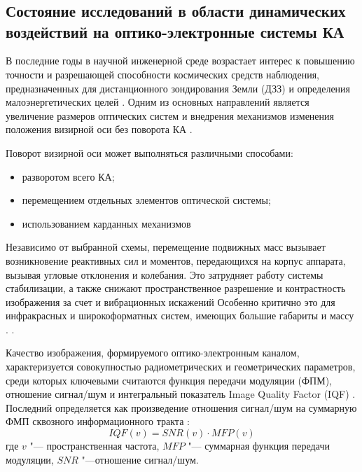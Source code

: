 \chapter{}\label{ch:ch1}
\section{Состояние исследований в области динамических воздействий на оптико-электронные системы КА}

В последние годы в научной инженерной среде возрастает интерес к повышению точности и разрешающей способности космических средств наблюдения, предназначенных для дистанционного зондирования Земли (ДЗЗ) и определения малоэнергетических целей \cite{haroon2020multisized, bouwmeester2023enabling, saunders2017building, cheng2024geometric, hamm2015earth}. Одним из основных направлений является увеличение размеров оптических систем и внедрения механизмов изменения положения визирной оси без поворота КА \cite{kandepi2024agile, franze2023attitude}.

Поворот визирной оси может выполняться различными способами:
\begin{itemize}
	\item разворотом всего КА;
	\item перемещением отдельных элементов оптической системы;
	\item использованием карданных механизмов \cite{leskov2010kardan,negro2023inertial}
\end{itemize}

Независимо от выбранной схемы, перемещение подвижных масс вызывает возникновение реактивных сил и моментов, передающихся на корпус аппарата, вызывая угловые отклонения и колебания. Это затрудняет работу системы стабилизации, а также снижают пространственное разрешение и контрастность изображения за счет \blur{} и вибрационных искажений  \cite{lappas2002attitude, углова2019оценка, zhao2023effect} Особенно критично это для инфракрасных и широкоформатных систем, имеющих большие габариты и массу \cite{shorthill1990infrared. shivanandan1985far}.   \cite{pittelkau2012pointing, dennehy2021spacecraft, alvarez2018spacecraft}.

Качество изображения, формируемого оптико-электронным каналом, характеризуется совокупностью радиометрических и геометрических параметров, среди которых ключевыми считаются функция передачи модуляции (ФПМ), отношение сигнал/шум и интегральный показатель Image Quality Factor (IQF) \cite{leachtenauer1997general}. Последний определяется как произведение отношения сигнал/шум на суммарную ФМП сквозного информационного тракта \cite{}:
\begin{equation}
	\label{eq:eq_IQF}
	 IQF(v)=SNR(v)\cdot MFP(v)
\end{equation}
	где \( v \) "--- пространственная частота, \( MFP \) "--- суммарная функция передачи модуляции, \( SNR \) "---отношение сигнал/шум.

